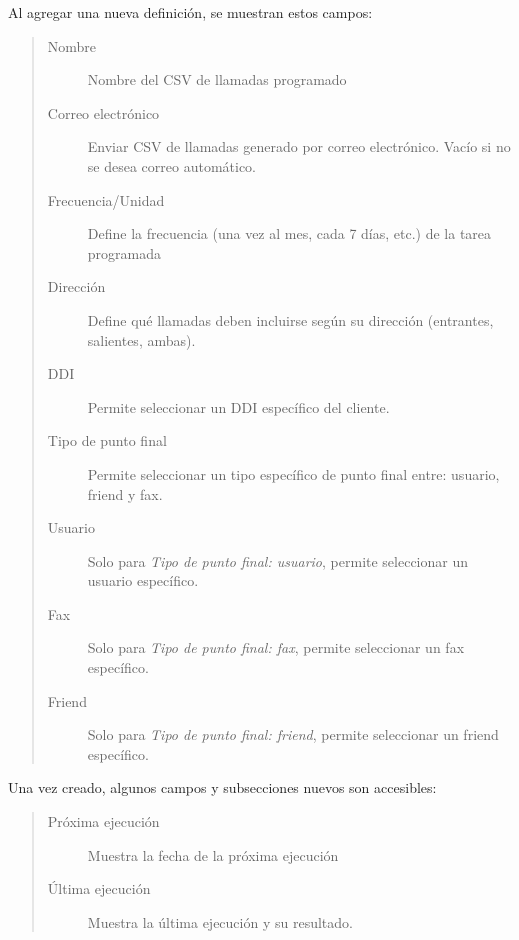 \documentclass[letterpaper,10pt,spanish]{sphinxmanual}
\begin{document}
Al agregar una nueva definición, se muestran estos campos:
\begin{quote}
\begin{description}
\item[{Nombre}] \leavevmode
Nombre del CSV de llamadas programado

\item[{Correo electrónico}] \leavevmode
Enviar CSV de llamadas generado por correo electrónico. Vacío si no se desea correo automático.

\item[{Frecuencia/Unidad}] \leavevmode
Define la frecuencia (una vez al mes, cada 7 días, etc.) de la tarea programada

\item[{Dirección}] \leavevmode
Define qué llamadas deben incluirse según su dirección (entrantes, salientes, ambas).

\item[{DDI}] \leavevmode
Permite seleccionar un DDI específico del cliente.

\item[{Tipo de punto final}] \leavevmode
Permite seleccionar un tipo específico de punto final entre: usuario, friend y fax.

\item[{Usuario}] \leavevmode
Solo para \emph{Tipo de punto final: usuario}, permite seleccionar un usuario específico.

\item[{Fax}] \leavevmode
Solo para \emph{Tipo de punto final: fax}, permite seleccionar un fax específico.

\item[{Friend}] \leavevmode
Solo para \emph{Tipo de punto final: friend}, permite seleccionar un friend específico.

\end{description}
\end{quote}

Una vez creado, algunos campos y subsecciones nuevos son accesibles:
\begin{quote}
\begin{description}
\item[{Próxima ejecución}] \leavevmode
Muestra la fecha de la próxima ejecución

\item[{Última ejecución}] \leavevmode
Muestra la última ejecución y su resultado.

\end{description}
\end{quote}
\end{document}
